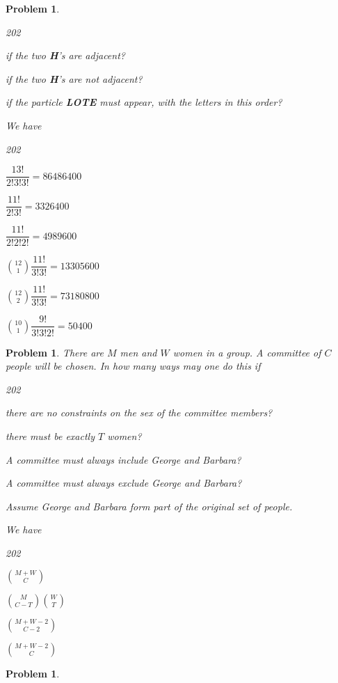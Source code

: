 \documentclass[11pt, openany]{book}
\theoremstyle{change} \theoremheaderfont{\blue\sffamily\bfseries}
\newtheorem{pro}[thm]{Problem}
\theoremstyle{nonumberplain} \theoremheaderfont{\sffamily\bfseries}
\def\binom#1#2{{#1\choose#2}}
\newcommand{\dis}{\displaystyle}
\newcommand{\í}{\'{\i}}
\begin{document}
\begin{multicols}{2}
\begin{pro}
\begin{dingautolist}{202}
\item if the two {\bf H}'s are adjacent?\\
 \item if the two {\bf H}'s are not adjacent?\\
 \item if the particle {\bf LOTE} must appear, with the letters
in this order?
\end{dingautolist}
\begin{answer} We have \begin{dingautolist}{202}
\item   $\dfrac{13!}{2!3!3!} = 86486400$\item  $\dfrac{11!}{2!3!} =
3326400$\item  $\dfrac{11!}{2!2!2!} = 4989600$\item
$\binom{12}{1}\dfrac{11!}{3!3!} = 13305600$\item
$\binom{12}{2}\dfrac{11!}{3!3!} = 73180800$\item
$\binom{10}{1}\dfrac{9!}{3!3!2!} = 50400$
\end{dingautolist}
\end{answer}
      \end{pro}
      \begin{pro}
There are $M$ men and $W$ women in a group. A committee of $C$
people will be chosen. In how many ways may one do this if
\begin{dingautolist}{202}
\item there are no constraints on the sex  of the committee
members? \item there must be exactly $T$ women? \item A committee
must always include George and Barbara?  \item  A committee must
always exclude George and Barbara?
\end{dingautolist}
Assume George and Barbara form part of the original set of people.
\begin{answer} We have \begin{dingautolist}{202} \item
$\dis{\binom{M + W}{C}}$\item  $\dis{\binom{M}{C -
T}\binom{W}{T}}$\item  $\binom{M + W - 2}{C - 2}$ \item  $\binom{M +
W - 2}{C}$
\end{dingautolist}
\end{answer}
    \end{pro}
         \begin{pro}

\end{pro}
\end{multicols}
\end{document}
